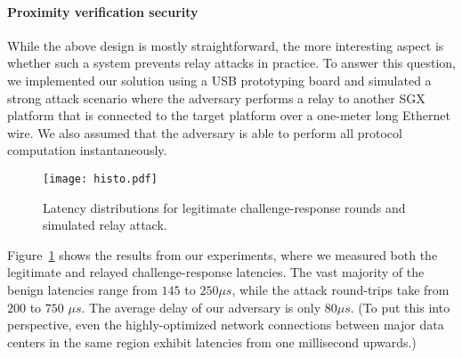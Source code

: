 

\paragraph{Proximity verification security} While the above design is mostly straightforward, the more interesting aspect is whether such a system prevents relay attacks in practice. To answer this question, we implemented our solution using a USB prototyping board and simulated a strong attack scenario where the adversary performs a relay to another SGX platform that is connected to the target platform over a one-meter long Ethernet wire. We also assumed that the adversary is able to perform all protocol computation instantaneously. 

\begin{figure}[t]
  \centering
    \texttt{[image: histo.pdf]} 
    \caption{Latency distributions for legitimate challenge-response rounds and simulated relay attack.}
    \label{graph:histogram}
\end{figure}

Figure~\ref{graph:histogram} shows the results from our experiments, where we measured both the legitimate and relayed challenge-response latencies. The vast majority of the benign latencies range from $145$ to $250 \mu s$, while the attack round-trips take from $200$ to $750$ $\mu s$. The average delay of our adversary is only $80 \mu s$. (To put this into perspective, even the highly-optimized network connections between major data centers in the same region exhibit latencies from one millisecond upwards.) 

